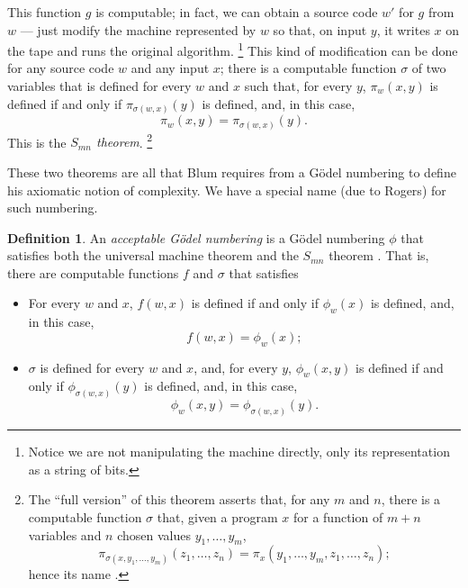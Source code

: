 \documentclass[12pt]{article}
\theoremstyle{definition}
\newtheorem{definition}{Definition}
\begin{document}
This function $g$ is computable;
in fact, we can obtain a source code $w'$ for $g$ from $w$
--- just modify the machine represented by $w$
so that, on input $y$,
it writes $x$ on the tape and runs the original algorithm.%
\footnote{
    Notice we are not manipulating the machine directly,
    only its representation as a string of bits.
}
This kind of modification can be done for any source code $w$
and any input $x$;
there is a computable function $\sigma$ of two variables
that is defined for every $w$ and $x$ such that,
for every $y$,
$\pi_w(x, y)$ is defined if and only if $\pi_{\sigma(w, x)}(y)$ is defined,
and, in this case,
\begin{equation*}
    \pi_w(x, y) = \pi_{\sigma(w, x)}(y).
\end{equation*}
This is the \emph{$S_{mn}$ theorem}.%
\footnote{
    The ``full version'' of this theorem asserts that,
    for any $m$ and $n$,
    there is a computable function $\sigma$ that,
    given a program $x$ for a function of $m + n$ variables
    and $n$ chosen values $y_1, \dots, y_m$,
    \begin{equation*}
        \pi_{\sigma(x, y_1, \dots, y_m)}(z_1, \dots, z_n) =
            \pi_x(y_1, \dots, y_m, z_1, \dots, z_n);
    \end{equation*}
    hence its name \cite[p.~23]{Rogers1987}.
}

These two theorems are all that Blum requires from a Gödel numbering
to define his axiomatic notion of complexity.
We have a special name (due to Rogers) for such numbering.

\begin{definition}
    An \emph{acceptable Gödel numbering}
    is a Gödel numbering $\phi$
    that satisfies both the universal machine theorem
    and the $S_{mn}$ theorem \cite[p.~41]{Rogers1987}.
    That is, there are computable functions $f$ and $\sigma$
    that satisfies
    \begin{itemize}
        \item For every $w$ and $x$,
            $f(w, x)$ is defined if and only if $\phi_w(x)$ is defined,
            and, in this case,
            \begin{equation*}
                f(w, x) = \phi_w(x);
            \end{equation*}
        \item $\sigma$ is defined for every $w$ and $x$,
            and, for every $y$,
            $\phi_w(x, y)$ is defined if and only if $\phi_{\sigma(w, x)}(y)$ is defined,
            and, in this case,
            \begin{equation*}
                \phi_w(x, y) = \phi_{\sigma(w, x)}(y).
            \end{equation*}
    \end{itemize}
\end{definition}
\end{document}
